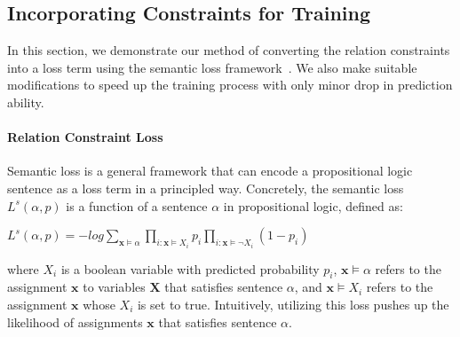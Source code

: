 \subsection{Incorporating  Constraints for Training}
\label{sec:loss_term}
In this section, we demonstrate our method of converting the relation constraints into a loss term using the semantic loss framework~\cite{xu2017semantic}.
We also make suitable modifications to speed up the training process with only minor drop in prediction ability.

\paragraph{Relation Constraint Loss}
Semantic loss is a general framework that can encode a propositional logic sentence as a loss term in a principled way.
Concretely, the semantic loss $L^{s}(\alpha, p)$ is a function of a sentence $\alpha$ in propositional logic, defined as:
\begin{center}
	$L^{s}(\alpha, p) = -log\sum\limits_{\bm x\models\alpha}\prod\limits_{i:\bm x\models X_i}p_i\prod\limits_{i:\bm x\models \neg X_i}(1-p_i)$
\end{center}
where $X_i$ is a boolean variable with predicted probability $p_i$,  $\bm x \models \alpha$ refers to the assignment $\bm x$ to variables $\bm X$ that satisfies sentence $\alpha$, and $\bm x \models X_i$ refers to the assignment $\bm x$ whose $X_i$ is set to true.
Intuitively, utilizing this loss pushes up the likelihood of assignments $\bm x$ that satisfies sentence $\alpha$.

